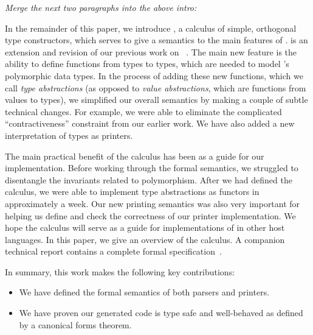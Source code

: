 {\em Merge the next two paragraphs into the above intro:}

In the remainder of this paper, we introduce \ddc{}, a calculus of
simple, orthogonal type constructors, which serves to give a semantics
to the main features of \padsml.  \ddc{} is an extension and revision
of our previous work on \ddcold{}~\cite{fisher+:next700ddl}.  The main
new feature is the ability to define functions from types to types,
which are needed to model \padsml's polymorphic data types.  In the
process of adding these new functions, which we call {\em type
  abstractions} (as opposed to {\em value abstractions}, which are
functions from values to types), we simplified our overall semantics
by making a couple of subtle technical changes.  For example, we were
able to eliminate the complicated ``contractiveness'' constraint from
our earlier work.  We have also added a new interpretation of \ddc{}
types as printers.

The main practical benefit of the calculus has been as a guide for our
implementation. Before working through the formal semantics, we
struggled to disentangle the invariants related to polymorphism. After
we had defined the calculus, we were able to implement type
abstractions as \ocaml{} functors in approximately a week.  Our new
printing semantics was also very important for helping us define and
check the correctness of our printer implementation.  We hope the
calculus will serve as a guide for implementations of \pads{} in
other host languages.  In this paper, we give an overview of the
calculus.  A companion technical report contains a complete formal
specification~\cite{fisher+:popl-sub-long}.

In summary, this work makes the following key contributions:
\begin{itemize}
\item We have defined the formal semantics of both \padsml{} parsers 
and printers. 
\item We have proven our generated code is type safe and
well-behaved as defined by a canonical forms theorem.
\end{itemize}

